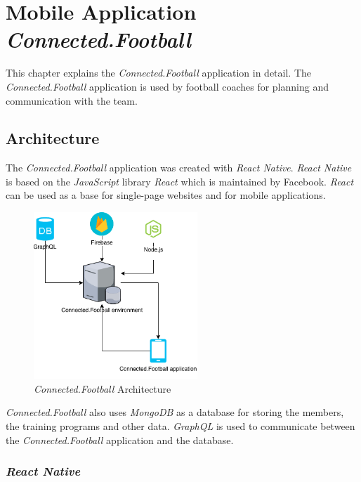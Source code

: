 \section{Mobile Application \textit{Connected.Football}}
\label{sec:Product}
This chapter explains the \textit{Connected.Football} application in detail. The \textit{Connected.Football} application is used by football coaches for planning and communication with the team. 

\subsection{Architecture}
The \textit{Connected.Football} application was created with \textit{React Native}. \textit{React Native} is based on the \textit{JavaScript} library \textit{React} which is maintained by Facebook. \textit{React} can be used as a base for single-page websites and for mobile applications. 

\begin{figure}[H]
    \centering
    \includegraphics[width=0.55\textwidth,keepaspectratio]{content/pictures/architecture.png}
	\caption{\textit{Connected.Football} Architecture}
	\label{fig:connected_football_architecture}
\end{figure}

\textit{Connected.Football} also uses \textit{MongoDB} as a database for storing the members, the training programs and other data. \textit{GraphQL} is used to communicate between the \textit{Connected.Football} application and the database. 

\subsubsection{\textit{React Native}}
\label{sssec:react_native}

